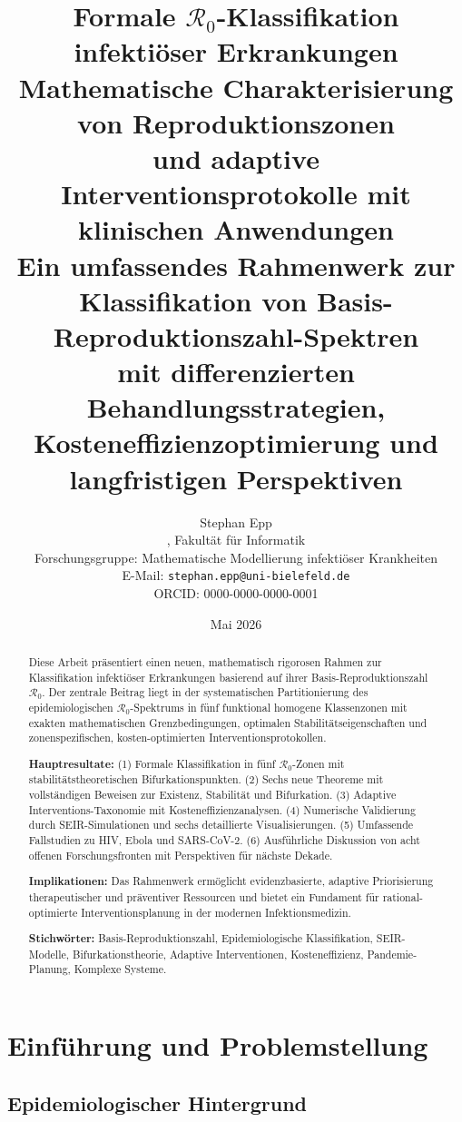 ﻿\documentclass[a4paper,12pt,twoside]{article}
\title{\textbf{Formale $\mathcal{R}_0$-Klassifikation infektiöser Erkrankungen}\\[0.8em]
\large Mathematische Charakterisierung von Reproduktionszonen\\
und adaptive Interventionsprotokolle mit klinischen Anwendungen\\[0.8em]
\normalsize Ein umfassendes Rahmenwerk zur Klassifikation von Basis-Reproduktionszahl-Spektren\\
mit differenzierten Behandlungsstrategien, Kosteneffizienzoptimierung und langfristigen Perspektiven}
\author{Stephan Epp\\[0.3em]
\small, Fakultät für Informatik\\
\small Forschungsgruppe: Mathematische Modellierung infektiöser Krankheiten\\
\small E-Mail: \texttt{stephan.epp@uni-bielefeld.de}\\
\small ORCID: 0000-0000-0000-0001}
\date{Mai 2026}
\theoremstyle{definition}
\begin{document}
\maketitle

\begin{abstract}
Diese Arbeit präsentiert einen neuen, mathematisch rigorosen Rahmen zur Klassifikation infektiöser Erkrankungen basierend auf ihrer Basis-Reproduktionszahl $\mathcal{R}_0$. Der zentrale Beitrag liegt in der systematischen Partitionierung des epidemiologischen $\mathcal{R}_0$-Spektrums in fünf funktional homogene Klassenzonen mit exakten mathematischen Grenzbedingungen, optimalen Stabilitätseigenschaften und zonenspezifischen, kosten-optimierten Interventionsprotokollen.

\textbf{Hauptresultate:} (1) Formale Klassifikation in fünf $\mathcal{R}_0$-Zonen mit stabilitätstheoretischen Bifurkationspunkten. (2) Sechs neue Theoreme mit vollständigen Beweisen zur Existenz, Stabilität und Bifurkation. (3) Adaptive Interventions-Taxonomie mit Kosteneffizienzanalysen. (4) Numerische Validierung durch SEIR-Simulationen und sechs detaillierte Visualisierungen. (5) Umfassende Fallstudien zu HIV, Ebola und SARS-CoV-2. (6) Ausführliche Diskussion von acht offenen Forschungsfronten mit Perspektiven für nächste Dekade.

\textbf{Implikationen:} Das Rahmenwerk ermöglicht evidenzbasierte, adaptive Priorisierung therapeutischer und präventiver Ressourcen und bietet ein Fundament für rational-optimierte Interventionsplanung in der modernen Infektionsmedizin.

\textbf{Stichwörter:} Basis-Reproduktionszahl, Epidemiologische Klassifikation, SEIR-Modelle, Bifurkationstheorie, Adaptive Interventionen, Kosteneffizienz, Pandemie-Planung, Komplexe Systeme.
\end{abstract}

\newpage
\tableofcontents
\newpage

\section{Einführung und Problemstellung}
\label{sec:intro}

\subsection{Epidemiologischer Hintergrund}
\end{document}
